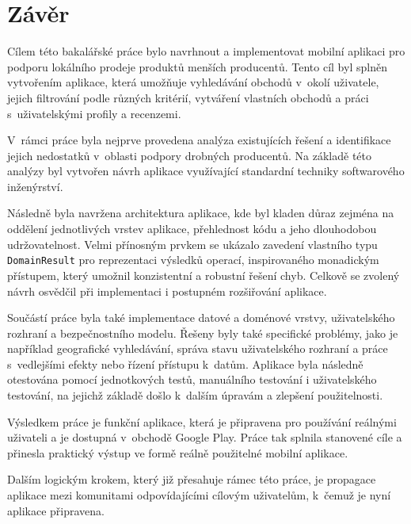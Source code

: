 \chapter*{Závěr}
Cílem této bakalářské práce bylo navrhnout a implementovat mobilní aplikaci pro podporu lokálního prodeje produktů menších producentů.
Tento cíl byl splněn vytvořením aplikace, která umožňuje vyhledávání obchodů v~okolí uživatele, jejich filtrování podle různých kritérií, vytváření vlastních obchodů a práci s~uživatelskými profily a recenzemi.

V~rámci práce byla nejprve provedena analýza existujících řešení a identifikace jejich nedostatků v~oblasti podpory drobných producentů.
Na základě této analýzy byl vytvořen návrh aplikace využívající standardní techniky softwarového inženýrství.

Následně byla navržena architektura aplikace, kde byl kladen důraz zejména na oddělení jednotlivých vrstev aplikace, přehlednost kódu a jeho dlouhodobou udržovatelnost.
Velmi přínosným prvkem se ukázalo zavedení vlastního typu \texttt{Domain\-Result} pro reprezentaci výsledků operací, inspirovaného monadickým přístupem, který umožnil konzistentní a robustní řešení chyb.
Celkově se zvolený návrh osvědčil při implementaci i postupném rozšiřování aplikace.

Součástí práce byla také implementace datové a doménové vrstvy, uživatelského rozhraní a bezpečnostního modelu.
Řešeny byly také specifické problémy, jako je například geografické vyhledávání, správa stavu uživatelského rozhraní a práce s~vedlejšími efekty nebo řízení přístupu k~datům.
Aplikace byla následně otestována pomocí jednotkových testů, manuálního testování i uživatelského testování, na jejichž základě došlo k~dalším úpravám a zlepšení použitelnosti.

Výsledkem práce je funkční aplikace, která je připravena pro používání reálnými uživateli a je dostupná v~obchodě Google Play.
Práce tak splnila stanovené cíle a přinesla praktický výstup ve formě reálně použitelné mobilní aplikace.

Dalším logickým krokem, který již přesahuje rámec této práce, je propagace aplikace mezi komunitami odpovídajícími cílovým uživatelům, k~čemuž je nyní aplikace připravena.